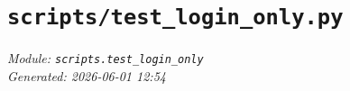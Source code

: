 
\section{\texttt{scripts/test\_login\_only.py}}
\textit{Module: \texttt{scripts.test\_login\_only}} \\
\textit{Generated: 2026-06-01 12:54} \\
